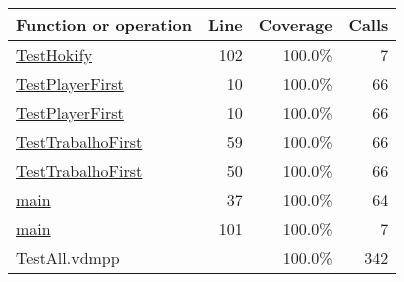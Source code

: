 \bigskip
\begin{longtable}{|l|r|r|r|}
\hline
Function or operation & Line & Coverage & Calls \\
\hline
\hline
\hyperref[TestHokify:102]{TestHokify} & 102&100.0\% & 7 \\
\hline
\hyperref[TestPlayerFirst:10]{TestPlayerFirst} & 10&100.0\% & 66 \\
\hline
\hyperref[TestPlayerFirst:10]{TestPlayerFirst} & 10&100.0\% & 66 \\
\hline
\hyperref[TestTrabalhoFirst:59]{TestTrabalhoFirst} & 59&100.0\% & 66 \\
\hline
\hyperref[TestTrabalhoFirst:50]{TestTrabalhoFirst} & 50&100.0\% & 66 \\
\hline
\hyperref[main:37]{main} & 37&100.0\% & 64 \\
\hline
\hyperref[main:101]{main} & 101&100.0\% & 7 \\
\hline
\hline
TestAll.vdmpp & & 100.0\% & 342 \\
\hline
\end{longtable}

